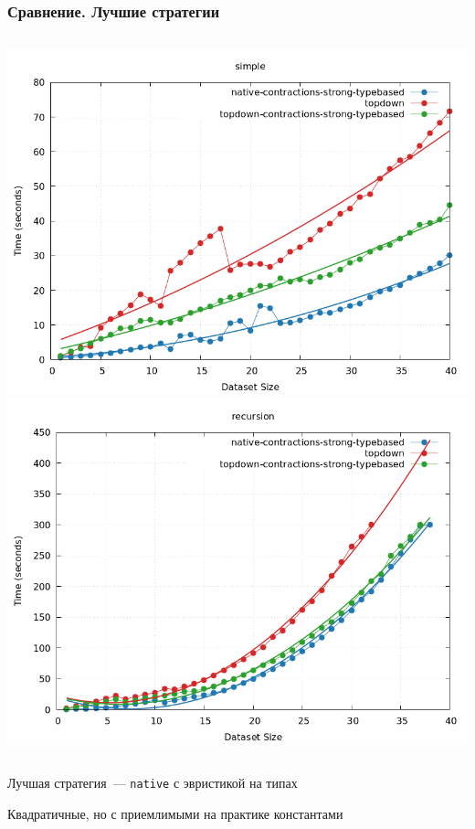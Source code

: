 \documentclass{beamer}
\begin{document}
\begin{frame}\frametitle{Сравнение. Лучшие стратегии}
  \begin{columns}
    \includegraphics[width=\textwidth]{winners_simple.png}
    \includegraphics[width=\textwidth]{winners_recursion.png}
  \end{columns}
  \bigskip
  \centering

  Лучшая стратегия~--- \texttt{native} с эвристикой на типах
  \bigskip

  Квадратичные, но с приемлимыми на практике константами
  \end{frame}  
\end{document}
